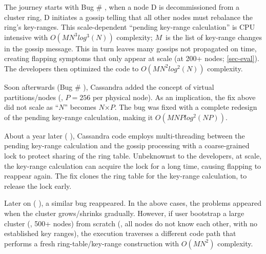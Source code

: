 The journey starts with Bug \# \cite{CA-Two}, when a node D is
decommissioned from a cluster ring, D initiates a gossip telling that all other
nodes must rebalance the ring's key-ranges.  This scale-dependent ``pending
key-range calculation'' is CPU intensive with
%
$O(MN^3log^3(N))$  %
%
complexity; $M$~is the list of key-range changes in the gossip message.  This
in turn leaves many gossips not propagated on time, creating flapping symptoms
that only appear at scale (at 200+ nodes; \sec\ref{sec-eval}). The developers
then optimized the code to
%
$O(MN^2log^2(N))$ complexity.



Soon afterwards (Bug \# \cite{CA-Tri}), Cassandra added the concept of
virtual partitions/nodes (\eg, $P$$=$$256$ per physical node).  As an
implication, the fix above did not scale as ``$N$'' becomes $N$$\times$$P$.
%
The bug was fixed with a complete redesign of the pending key-range
calculation, making it
$O(MNPlog^2(NP))$.

About a year later ( \cite{CA-Four}), Cassandra code employs
multi-threading between the pending key-range calculation and the gossip
processing with a coarse-grained lock to protect sharing of the ring
table.  Unbeknownst to the developers, at scale, the key-range calculation
can acquire the lock for a long time, causing flapping to reappear again.
The fix clones the ring table for the key-range calculation, to release the
lock early.



Later on ( \cite{CA-One}), a similar bug reappeared.  In the above
cases, the problems appeared when the cluster grows/shrinks gradually.
However, if user bootstrap a large cluster (\eg, 500+ nodes) from
scratch (\ie, all nodes do not know each other, with no established
key ranges),
%
the execution traverses a different code path that
performs a fresh ring-table/key-range construction with
$O(MN^2)$ %
complexity.

%
%


